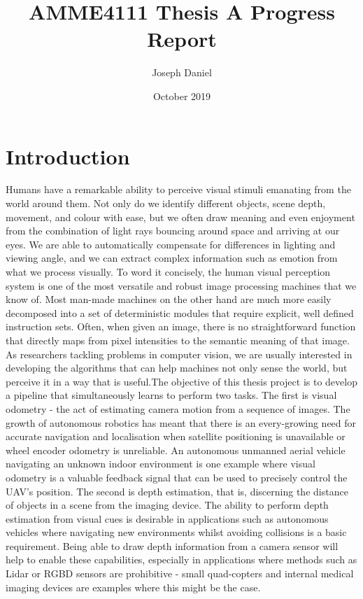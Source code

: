 \documentclass[openany]{book}
\title{AMME4111 Thesis A Progress Report}
\author{Joseph Daniel}
\date{October 2019}
\begin{document}
\maketitle

\tableofcontents

\chapter{Introduction}
Humans have a remarkable ability to perceive visual stimuli emanating from the world around them. Not only do we identify different objects, scene depth, movement, and colour with ease, but we often draw meaning and even enjoyment from the combination of light rays bouncing around space and arriving at our eyes. We are able to automatically compensate for differences in lighting and viewing angle, and we can extract complex information such as emotion from what we process visually. To word it concisely, the human visual perception system is one of the most versatile and robust image processing machines that we know of. Most man-made machines on the other hand are much more easily decomposed into a set of deterministic modules that require explicit, well defined instruction sets. Often, when given an image, there is no straightforward function that directly maps from pixel intensities to the semantic meaning of that image. As researchers tackling problems in computer vision, we are usually interested in developing the algorithms that can help machines not only sense the world, but perceive it in a way that is useful.The objective of this thesis project is to develop a pipeline that simultaneously learns to perform two tasks. The first is visual odometry - the act of estimating camera motion from a sequence of images. The growth of autonomous robotics has meant that there is an every-growing need for accurate navigation and localisation when satellite positioning is unavailable or wheel encoder odometry is unreliable. An autonomous unmanned aerial vehicle navigating an unknown indoor environment is one example where visual odometry is a valuable feedback signal that can be used to precisely control the UAV's position. The second is depth estimation, that is, discerning the distance of objects in a scene from the imaging device. The ability to perform depth estimation from visual cues is desirable in applications such as autonomous vehicles where navigating new environments whilst avoiding collisions is a basic requirement. Being able to draw depth information from a camera sensor will help to enable these capabilities, especially in applications where methods such as Lidar or RGBD sensors are prohibitive - small quad-copters and internal medical imaging devices are examples where this might be the case.
\end{document}
